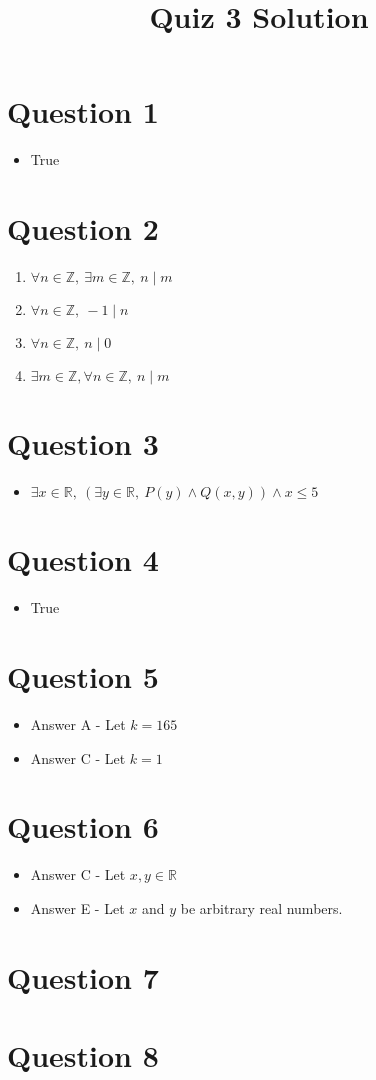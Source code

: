 \documentclass[12pt]{article}
\begin{document}
\title{Quiz 3 Solution}
\maketitle

\section*{Question 1}
\begin{itemize}
    \item True

\end{itemize}

\section*{Question 2}
\begin{enumerate}
    \item $\forall n \in \mathbb{Z},\: \exists m \in \mathbb{Z},\: n \mid m$
    \item $\forall n \in \mathbb{Z},\: -1 \mid n$
    \item $\forall n \in \mathbb{Z},\: n \mid 0$
    \item $\exists m \in \mathbb{Z}, \forall n \in \mathbb{Z},\: n \mid m$
\end{enumerate}

\section*{Question 3}
\begin{itemize}
    \item $\exists x \in \mathbb{R},\:(\exists y \in \mathbb{R},\:P(y) \land Q(x,y)) \land x \leq 5$
\end{itemize}

\section*{Question 4}
\begin{itemize}
    \item True
\end{itemize}

\section*{Question 5}
\begin{itemize}
    \item Answer A - Let $k = 165$
    \item Answer C - Let $k = 1$
\end{itemize}

\section*{Question 6}
\begin{itemize}
    \item Answer C - Let $x,y \in \mathbb{R}$
    \item Answer E - Let $x$ and $y$ be arbitrary real numbers.
\end{itemize}


\section*{Question 7}

\section*{Question 8}
\end{document}
